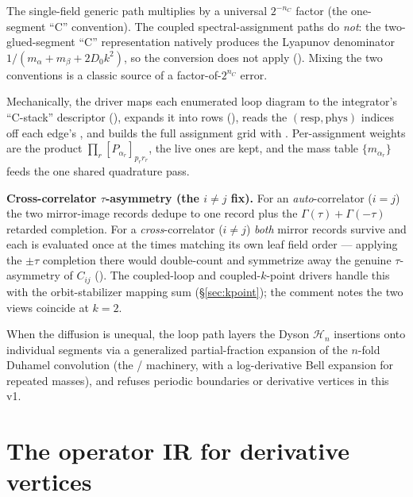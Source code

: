 \begin{gotcha}
The single-field generic path multiplies by a universal $2^{-n_{C}}$ factor (the
one-segment ``C'' convention). The coupled spectral-assignment paths do
\emph{not}: the two-glued-segment ``C'' representation natively produces the
Lyapunov denominator $1/(m_{\alpha}+m_{\beta}+2D_{0}k^{2})$, so the conversion
does not apply (). Mixing the two conventions
is a classic source of a factor-of-$2^{n_{C}}$ error.
\end{gotcha}

Mechanically, the driver maps each enumerated loop diagram to the integrator's
``C-stack'' descriptor (), expands it into rows
(), reads the $(\text{resp},\text{phys})$ indices off each
edge's , and builds the full assignment grid with
. Per-assignment weights are
the product $\prod_{r}[P_{\alpha_{r}}]_{p_{r}r_{r}}$, the live ones are kept, and
the mass table $\{m_{\alpha_{r}}\}$ feeds the one shared quadrature pass.

\begin{gotcha}
\textbf{Cross-correlator $\tau$-asymmetry (the $i\ne j$ fix).} For an
\emph{auto}-correlator ($i=j$) the two mirror-image records dedupe to one record
plus the $\Gamma(\tau)+\Gamma(-\tau)$ retarded completion. For a
\emph{cross}-correlator ($i\ne j$) \emph{both} mirror records survive and each is
evaluated once at the times matching its own leaf field order --- applying the
$\pm\tau$ completion there would double-count and symmetrize away the genuine
$\tau$-asymmetry of $C_{ij}$ (). The
coupled-loop and coupled-$k$-point drivers handle this with the orbit-stabilizer
mapping sum (\S\ref{sec:kpoint}); the comment notes the two views coincide at
$k=2$.
\end{gotcha}

When the diffusion is unequal, the loop path layers the Dyson $\mathcal{H}_{n}$
insertions onto individual segments via a generalized partial-fraction expansion
of the $n$-fold Duhamel convolution (the  / 
machinery, with a log-derivative Bell expansion for repeated masses), and refuses
periodic boundaries or derivative vertices in this v1.

\section{The operator IR for derivative vertices}

